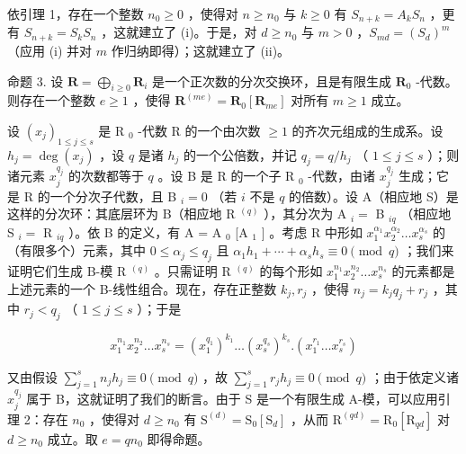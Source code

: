 依引理 1，存在一个整数 \(n_0 \geqslant 0\) ，使得对 \(n \geqslant n_0\) 与 \(k \geqslant 0\) 有 \(S_{n+k} = A_kS_n\) ，更有 \(S_{n+k} = S_kS_n\) ，这就建立了 (i)。于是，对 \(d \geqslant n_0\) 与 \(m > 0\) ，\(S_{md} = (S_d)^m\) （应用 (i) 并对 \(m\) 作归纳即得）；这就建立了 (ii)。

命题 3. 设 \(\mathbf{R} = \bigoplus_{i\geqslant 0}\mathbf{R}_i\) 是一个正次数的分次交换环，且是有限生成 \(\mathbf{R}_0\) -代数。则存在一个整数 \(e\geqslant 1\) ，使得 \(\mathbf{R}^{(me)} = \mathbf{R}_0[\mathbf{R}_{me}]\) 对所有 \(m\geqslant 1\) 成立。

设 \((x_{j})_{1\leqslant j\leqslant s}\) 是 R \(_{0}\) -代数 R 的一个由次数 \(\geqslant 1\) 的齐次元组成的生成系。设 \(h_{j} = \deg(x_{j})\) ，设 \(q\) 是诸 \(h_{j}\) 的一个公倍数，并记 \(q_{j} = q/h_{j}\) （ \(1 \leqslant j \leqslant s\) ）；则诸元素 \(x_{j}^{q_{j}}\) 的次数都等于 \(q\) 。设 B 是 R 的一个子 R \(_{0}\) -代数，由诸 \(x_{j}^{q_{j}}\) 生成；它是 R 的一个分次子代数，且 B \(_{i} = 0\) （若 \(i\) 不是 \(q\) 的倍数）。设 A（相应地 S）是这样的分次环：其底层环为 B（相应地 R \(^{(q)}\) ），其分次为 A \(_{i} =\) B \(_{iq}\) （相应地 S \(_{i} =\) R \(_{iq}\) ）。依 B 的定义，有 A = A \(_{0}\) {[}A \(_{1}\) {]} 。考虑 R 中形如 \(x_{1}^{\alpha_{1}}x_{2}^{\alpha_{2}}\ldots x_{s}^{\alpha_{s}}\) 的（有限多个）元素，其中 \(0 \leqslant \alpha_{j} \leqslant q_{j}\) 且 \(\alpha_{1}h_{1} + \cdots + \alpha_{s}h_{s} \equiv 0 \pmod{q}\) ；我们来证明它们生成 B-模 R \(^{(q)}\) 。只需证明 R \(^{(q)}\) 的每个形如 \(x_{1}^{n_{1}}x_{2}^{n_{2}}\ldots x_{s}^{n_{s}}\) 的元素都是上述元素的一个 B-线性组合。现在，存在正整数 \(k_{j}, r_{j}\) ，使得 \(n_{j} = k_{j}q_{j} + r_{j}\) ，其中 \(r_{j} < q_{j}\) （ \(1 \leqslant j \leqslant s\) ）；于是

\[
x _ {1} ^ {n _ {1}} x _ {2} ^ {n _ {2}} \dots x _ {s} ^ {n _ {s}} = (x _ {1} ^ {q _ {1}}) ^ {k _ {1}} \dots (x _ {s} ^ {q _ {s}}) ^ {k _ {s}}. (x _ {1} ^ {r _ {1}} \dots x _ {s} ^ {r _ {s}})
\]

又由假设 \(\sum_{j=1}^{s} n_j h_j \equiv 0 \pmod{q}\) ，故 \(\sum_{j=1}^{s} r_j h_j \equiv 0 \pmod{q}\) ；由于依定义诸 \(x_j^{q_j}\) 属于 B，这就证明了我们的断言。由于 S 是一个有限生成 A-模，可以应用引理 2：存在 \(n_0\) ，使得对 \(d \geqslant n_0\) 有 \(\mathrm{S}^{(d)} = \mathrm{S}_0[\mathrm{S}_d]\) ，从而 \(\mathrm{R}^{(qd)} = \mathrm{R}_0[\mathrm{R}_{qd}]\) 对 \(d \geqslant n_0\) 成立。取 \(e = q n_0\) 即得命题。

